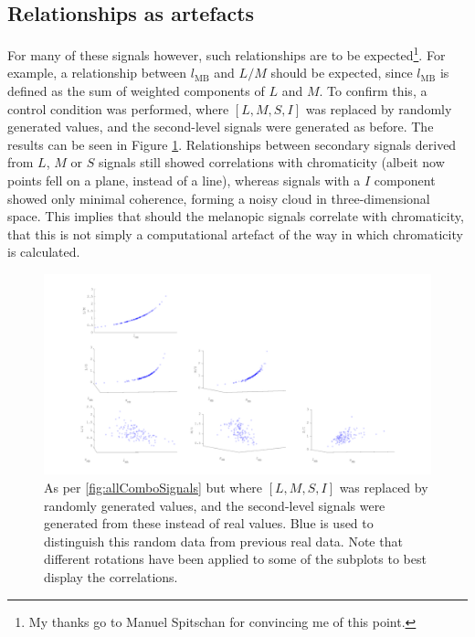 \subsection{Relationships as artefacts}

For many of these signals however, such relationships are to be expected\footnote{My thanks go to Manuel Spitschan for convincing me of this point.}. For example, a relationship between $l_{\text{MB}}$ and $L/M$ should be expected, since $l_{\text{MB}}$ is defined as the sum of weighted components of $L$ and $M$. To confirm this, a control condition was performed, where $[L,M,S,I]$ was replaced by randomly generated values, and the second-level signals were generated as before. The results can be seen in Figure \ref{fig:allComboSignals_rand}. Relationships between secondary signals derived from $L$, $M$ or $S$ signals still showed correlations with chromaticity (albeit now points fell on a plane, instead of a line), whereas signals with a $I$ component showed only minimal coherence, forming a noisy cloud in three-dimensional space. This implies that should the melanopic signals correlate with chromaticity, that this is not simply a computational artefact of the way in which chromaticity is calculated.

\begin{figure}
\includegraphics[max width=1.2\textwidth]{figs/comp/predictingChromaticity/allComboSignals_rand.pdf} 
\caption{As per \ref{fig:allComboSignals} but where $[L,M,S,I]$ was replaced by randomly generated values, and the second-level signals were generated from these instead of real values. Blue is used to distinguish this random data from previous real data. Note that different rotations have been applied to some of the subplots to best display the correlations.}
\label{fig:allComboSignals_rand}
\end{figure}

